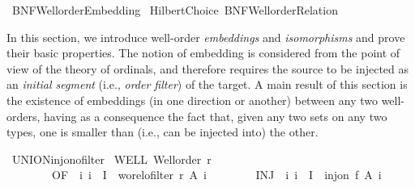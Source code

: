 %
\begin{isabellebody}%
%
%
\isadelimdocument
%
\endisadelimdocument
%
\isatagdocument
%
\isamarkuptrue%
%
\endisatagdocument
{\isafolddocument}%
%
\isadelimdocument
%
\endisadelimdocument
%
\isadelimtheory
%
\endisadelimtheory
%
\isatagtheory
{}\isamarkupfalse%
\ BNF{\isacharunderscore}{\kern0pt}Wellorder{\isacharunderscore}{\kern0pt}Embedding\isanewline
{}\ Hilbert{\isacharunderscore}{\kern0pt}Choice\ BNF{\isacharunderscore}{\kern0pt}Wellorder{\isacharunderscore}{\kern0pt}Relation\isanewline
{}%
\endisatagtheory
{\isafoldtheory}%
%
\isadelimtheory
%
\endisadelimtheory
%
\begin{isamarkuptext}%
In this section, we introduce well-order {\em embeddings} and {\em isomorphisms} and
prove their basic properties.  The notion of embedding is considered from the point
of view of the theory of ordinals, and therefore requires the source to be injected
as an {\em initial segment} (i.e., {\em order filter}) of the target.  A main result
of this section is the existence of embeddings (in one direction or another) between
any two well-orders, having as a consequence the fact that, given any two sets on
any two types, one is smaller than (i.e., can be injected into) the other.%
\end{isamarkuptext}\isamarkuptrue%
%
\isadelimdocument
%
\endisadelimdocument
%
\isatagdocument
%
\isamarkuptrue%
%
\endisatagdocument
{\isafolddocument}%
%
\isadelimdocument
%
\endisadelimdocument
{}\isamarkupfalse%
\ UNION{\isacharunderscore}{\kern0pt}inj{\isacharunderscore}{\kern0pt}on{\isacharunderscore}{\kern0pt}ofilter{\isacharcolon}{\kern0pt}\isanewline
{}\ WELL{\isacharcolon}{\kern0pt}\ {\isachardoublequoteopen}Well{\isacharunderscore}{\kern0pt}order\ r{\isachardoublequoteclose}\ \isanewline
\ \ \ \ \ \ \ \ OF{\isacharcolon}{\kern0pt}\ {\isachardoublequoteopen}{\isasymAnd}\ i{\isachardot}{\kern0pt}\ i\ {\isasymin}\ I\ {\isasymLongrightarrow}\ wo{\isacharunderscore}{\kern0pt}rel{\isachardot}{\kern0pt}ofilter\ r\ {\isacharparenleft}{\kern0pt}A\ i{\isacharparenright}{\kern0pt}{\isachardoublequoteclose}\ \isanewline
\ \ \ \ \ \ \ INJ{\isacharcolon}{\kern0pt}\ {\isachardoublequoteopen}{\isasymAnd}\ i{\isachardot}{\kern0pt}\ i\ {\isasymin}\ I\ {\isasymLongrightarrow}\ inj{\isacharunderscore}{\kern0pt}on\ f\ {\isacharparenleft}{\kern0pt}A\ i{\isacharparenright}{\kern0pt}{\isachardoublequoteclose}\isanewline

\end{isabellebody}
